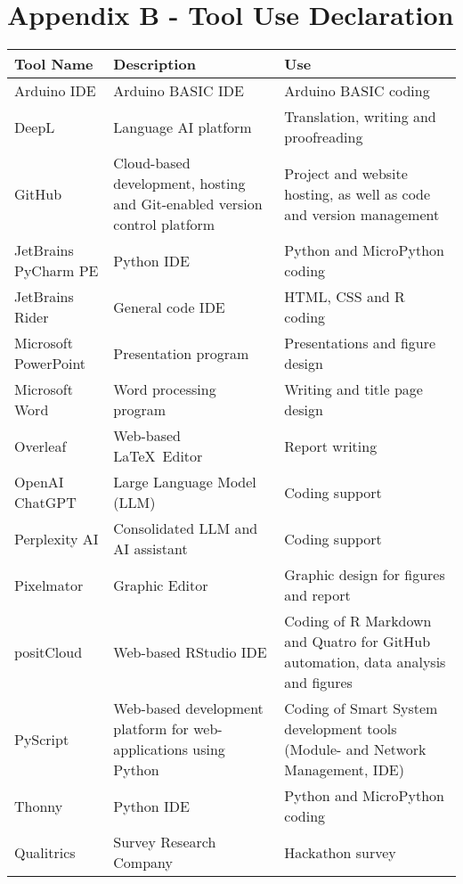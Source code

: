 \cleardoublepage%
\chapter*{\label{chap:apx_b}Appendix B - Tool Use Declaration}%
%
\begin{tabular}{| m{} | m{}| m{} |}
    \hline
    \textbf{Tool Name} & \textbf{Description} & \textbf{Use} \\
    \hline \hline
    Arduino IDE & Arduino BASIC IDE & Arduino BASIC coding \\
    \hline
    DeepL & Language AI platform & Translation, writing and proofreading \\
    \hline
    GitHub & Cloud-based development, hosting and Git-enabled version control platform & Project and website hosting, as well as code and version management \\
    \hline
    JetBrains PyCharm PE & Python IDE & Python and MicroPython coding \\
    \hline
    JetBrains Rider & General code IDE & HTML, CSS and R coding \\
    \hline
    Microsoft PowerPoint & Presentation program & Presentations and figure design \\
    \hline
    Microsoft Word & Word processing program & Writing and title page design \\
    \hline
    Overleaf & Web-based \LaTeX\ Editor & Report writing \\
    \hline
    OpenAI ChatGPT & Large Language Model (LLM) & Coding support \\
    \hline
    Perplexity AI & Consolidated LLM and AI assistant & Coding support \\
    \hline
    Pixelmator & Graphic Editor & Graphic design for figures and report \\
    \hline
    positCloud & Web-based RStudio IDE & Coding of R Markdown and Quatro for GitHub automation, data analysis and figures \\
    \hline
    PyScript & Web-based development platform for web-applications using
Python & Coding of Smart System development tools (Module- and Network Management, IDE) \\
    \hline
    Thonny & Python IDE & Python and MicroPython coding \\
    \hline
    Qualitrics & Survey Research Company & Hackathon survey \\
    \hline
\end{tabular}